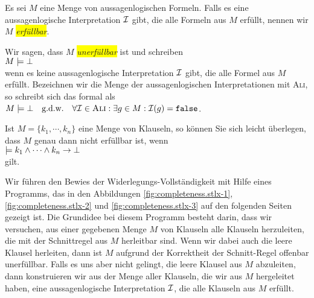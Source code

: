 \begin{Definition}
  Es sei $M$ eine Menge von aussagenlogischen Formeln.
  Falls es eine aussagenlogische Interpretation $\mathcal{I}$ gibt, die alle Formeln aus $M$ erf\"{u}llt, nennen
  wir $M$ \colorbox{yellow}{\emph{erf\"{u}llbar}}. 

  Wir sagen, dass $M$ \colorbox{yellow}{\emph{unerf\"{u}llbar}} ist und schreiben 
  \\[0.2cm]
  \hspace*{1.3cm}
  $M \models \bot$
  \\[0.2cm]
  wenn es keine aussagenlogische Interpretation $\mathcal{I}$ gibt, die alle Formel aus $M$ erf\"{u}llt.
  Bezeichnen wir die Menge der aussagenlogischen Interpretationen mit
  \textsc{Ali}, so schreibt sich das formal als
  \\[0.2cm]
  \hspace*{1.3cm}
  $M \models \bot \quad \mbox{g.d.w.} \quad \forall \mathcal{I} \in \textsc{Ali}: \exists g \in M: \mathcal{I}(g) = \mathtt{false}$.   
  \eox
\end{Definition}

\remark 
Ist $M = \{ k_1, \cdots, k_n \}$ eine Menge von Klauseln, so k\"{o}nnen Sie sich leicht \"{u}berlegen, dass
$M$ genau dann nicht erf\"{u}llbar ist, wenn
\\[0.2cm]
\hspace*{1.3cm}
$\models k_1 \wedge \cdots \wedge k_n \rightarrow \bot$
\\[0.2cm]
gilt. \eox

Wir f\"{u}hren den Bewies der Widerlegungs-Vollst\"{a}ndigkeit mit Hilfe eines Programms, das in den
Abbildungen \ref{fig:completeness.stlx-1}, \ref{fig:completeness.stlx-2} und
\ref{fig:completeness.stlx-3} auf den folgenden Seiten gezeigt ist.  Die Grundidee
bei diesem Programm besteht darin, dass wir versuchen, aus einer gegebenen Menge $M$ von Klauseln
alle Klauseln herzuleiten, die mit der Schnittregel aus $M$ herleitbar sind.  Wenn wir dabei auch
die leere Klausel herleiten, dann ist $M$ aufgrund der Korrektheit der Schnitt-Regel offenbar
unerf\"{u}llbar.  Falls es uns aber nicht gelingt, die leere Klausel aus $M$ abzuleiten, dann konstruieren wir
aus der Menge aller Klauseln, die wir aus $M$ hergeleitet haben, eine aussagenlogische Interpretation
$\mathcal{I}$, die alle Klauseln aus $M$ erf\"{u}llt.

